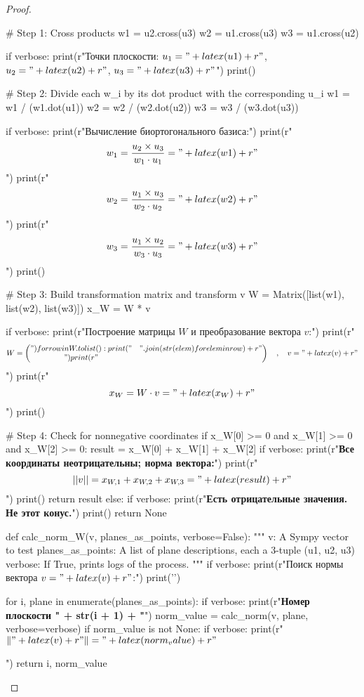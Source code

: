 \begin{proof}
\begin{sympycode}
    # Step 1: Cross products
    w1 = u2.cross(u3)
    w2 = u1.cross(u3)
    w3 = u1.cross(u2)

    if verbose:
        print(r"Точки плоскости: \(u_1 = " + latex(u1) + r"\), \(u_2 = " + latex(u2) + r"\), \(u_3 = " + latex(u3) + r"\)")
        print()

    # Step 2: Divide each w_i by its dot product with the corresponding u_i
    w1 = w1 / (w1.dot(u1))
    w2 = w2 / (w2.dot(u2))
    w3 = w3 / (w3.dot(u3))

    if verbose:
        print(r"Вычисление биортогонального базиса:")
        print(r"\[w_{1} = \frac{u_{2} \times u_{3}}{w_{1}\cdot u_{1}} = " + latex(w1) + r"\]")
        print(r"\[w_{2} = \frac{u_{1} \times u_{3}}{w_{2}\cdot u_{2}} = " + latex(w2) + r"\]")
        print(r"\[w_{3} = \frac{u_{1} \times u_{2}}{w_{3}\cdot u_{3}} = " + latex(w3) + r"\]")
        print()

    # Step 3: Build transformation matrix and transform v
    W = Matrix([list(w1), list(w2), list(w3)])
    x_W = W * v

    if verbose:
        print(r"Построение матрицы \(W\) и преобразование вектора \(v\):")
        print(r"\[W = \begin{pmatrix}")
        for row in W.tolist():
            print(" & ".join(str(elem) for elem in row) + r"\\")
        print(r"\end{pmatrix}\quad,\quad v = " + latex(v) + r"\]")
        print(r"\[x_{W} = W\cdot v = " + latex(x_W) + r"\]")
        print()

    # Step 4: Check for nonnegative coordinates
    if x_W[0] >= 0 and x_W[1] >= 0 and x_W[2] >= 0:
        result = x_W[0] + x_W[1] + x_W[2]
        if verbose:
            print(r"\textbf{Все координаты неотрицательны; норма вектора:}")
            print(r"\[ ||v|| = x_{W,1} + x_{W,2} + x_{W,3} = " + latex(result) + r"\]")
            print()
        return result
    else:
        if verbose:
            print(r"\textbf{Есть отрицательные значения. Не этот конус.}")
            print()
        return None

def calc_norm_W(v, planes_as_points, verbose=False):
    """
    v: A Sympy vector to test
    planes_as_points: A list of plane descriptions, each a 3-tuple (u1, u2, u3)
    verbose: If True, prints logs of the process.
    """
    if verbose:
        print(r"Поиск нормы вектора \(v = " + latex(v) + r"\):")
        print('\n')

    for i, plane in enumerate(planes_as_points):
        if verbose:
            print(r"\textbf{Номер плоскости " + str(i + 1) + "}")
        norm_value = calc_norm(v, plane, verbose=verbose)
        if norm_value is not None:
            if verbose:
                print(r"\( \left\Vert" + latex(v) + r"\right\Vert = " + latex(norm_value) + r"\)\par\medskip")
            return i, norm_value


\end{sympycode}
\end{proof}
